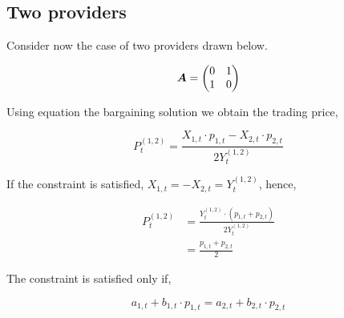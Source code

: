 \subsection{Two providers}

Consider now the case of two providers drawn below.

\vspace{5mm}
\begin{minipage}{.5\textwidth}
    \resizebox{\textwidth}{!}{}
\end{minipage}
\begin{minipage}{.45\textwidth}
    \begin{equation*}
        \bm{A} = \begin{pmatrix}
            0 & 1 \\
            1 & 0
        \end{pmatrix}
    \end{equation*}
\end{minipage}
\vspace{5mm}

Using equation the bargaining solution we obtain the trading price,

\begin{equation}
    P^{(1, 2)}_t = \frac{X_{1, t} \cdot p_{1, t} - X_{2, t} \cdot p_{2, t}}{2 Y^{(1, 2)}_t}
\end{equation}

If the constraint is satisfied, $X_{1, t} = - X_{2, t} = Y^{(1, 2)}_t$, hence,

\begin{equation}
    \begin{split}
        P^{(1, 2)}_t &= \frac{Y^{(1, 2)}_t \cdot \left( p_{1, t} + p_{2, t} \right)}{2  Y^{(1, 2)}_t} \\
        &= \frac{p_{1, t} + p_{2, t}}{2}
    \end{split}
\end{equation}

The constraint is satisfied only if,

\begin{equation}
    a_{1, t} + b_{1, t} \cdot p_{1, t} = a_{2, t} + b_{2, t} \cdot p_{2, t}
\end{equation}
